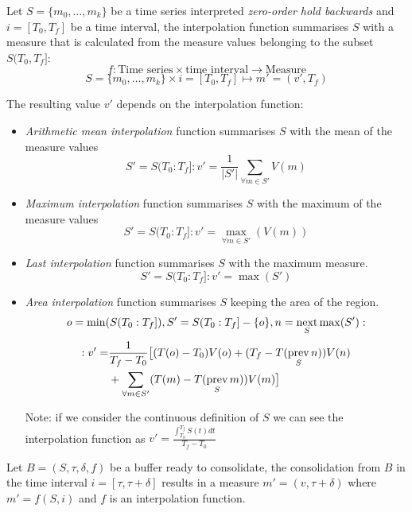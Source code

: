 \begin{definition}
  Let $S=\{m_0,\ldots,m_k\}$ be a time series interpreted
  \emph{zero-order hold backwards} and $i=[T_0,T_f]$ be a time
  interval, the interpolation function summarises $S$ with a measure
  that is calculated from the measure values belonging to the subset
  $S(T_0,T_f]$:
  \[
  f: \text{Time series} \times \text{time interval}
  \longrightarrow \text{Measure}
  \]
  \[
  S=\{m_0,\ldots,m_k\} \times i=[T_0,T_f] \mapsto m'=(v',T_f)
  \]

  The resulting value $v'$ depends on the interpolation function:

\begin{itemize}

\item \emph{Arithmetic mean interpolation} function summarises $S$
  with the mean of the measure values
  \[
  S'=S(T_0:T_f]:
  v' = \frac{1}{|S'|} \sum\limits_{\forall m\in S'} V(m)
  \]

\item \emph{Maximum interpolation} function summarises $S$ with the
  maximum of the measure values
  \[
  S'=S(T_0:T_f]:
  v' = \max_{\forall m \in S'}(V(m))
  \]

\item \emph{Last interpolation} function summarises $S$ with the
  maximum measure.
  \[
  S'=S(T_0:T_f]:
  v' = \max(S')
  \]

\item \emph{Area interpolation} function summarises $S$ keeping the
  area of the region.
  \[
  o=\min(S(T_0:T_f]),
  S'= S(T_0:T_f] - \{o\},
  n=\operatorname*{next}\limits_S \max(S'): 
  \]
  \[
  \begin{split}
  :v'  = & \frac{1}{T_f-T_0} 
  \big[ (T(o)-T_0)V(o) +( T_f- T(\operatorname*{prev}\limits_S n) )V(n) \\
    & {}+\sum\limits_{\forall m \in S'}( T(m)- T(\operatorname*{prev}\limits_S m) )V(m) \big]   
   \end{split}
  \]
  
  Note: if we consider the continuous definition of $S$ we can see the
  interpolation function as $v' = \frac{\int_{T_0}^{T_f} S(t) dt}{T_f
    - T_0}$

\end{itemize}

\end{definition}


Let $B=(S,\tau,\delta,f)$ be a buffer ready to consolidate, the
consolidation from $B$ in the time interval $i=[\tau,\tau+\delta]$
results in a measure $m'=(v,\tau+\delta)$ where $m'=f(S,i)$ and $f$ is
an interpolation function.

